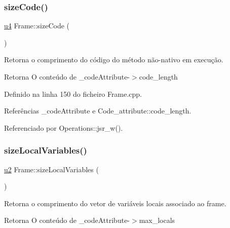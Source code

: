 \mbox{\label{classFrame_a3151aeb977a24c464ed8930c9100715d}} 
\subsubsection{\texorpdfstring{size\+Code()}{sizeCode()}}
{\footnotesize\ttfamily \hyperlink{BasicTypes_8h_ae5be1f726785414dd1b77d60df074c9d}{u4} Frame\+::size\+Code (\begin{DoxyParamCaption}{ }\end{DoxyParamCaption})}



Retorna o comprimento do código do método não-\/nativo em execução. 

\begin{DoxyReturn}{Retorna}
O conteúdo de \+\_\+code\+Attribute-\/$>$code\+\_\+length 
\end{DoxyReturn}


Definido na linha 150 do ficheiro Frame.\+cpp.



Referências \+\_\+code\+Attribute e Code\+\_\+attribute\+::code\+\_\+length.



Referenciado por Operations\+::jsr\+\_\+w().

\mbox{\label{classFrame_a2b65f6fa2195970fd25d69c17b5ca933}} 
\subsubsection{\texorpdfstring{size\+Local\+Variables()}{sizeLocalVariables()}}
{\footnotesize\ttfamily \hyperlink{BasicTypes_8h_a732cde1300aafb73b0ea6c2558a7a54f}{u2} Frame\+::size\+Local\+Variables (\begin{DoxyParamCaption}{ }\end{DoxyParamCaption})}



Retorna o comprimento do vetor de variáveis locais associado ao frame. 

\begin{DoxyReturn}{Retorna}
O conteúdo de \+\_\+code\+Attribute-\/$>$max\+\_\+locals 
\end{DoxyReturn}


